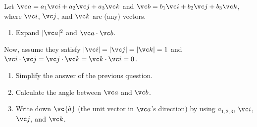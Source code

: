 \documentclass[11pt,pdfa,lastpage]{MishoNote}
\begin{document}
\begin{problems}
  \Problem[S] Let $ \vc a=a_1\vc i+a_2\vc j+a_3\vc k$ and $\vc b=b_1\vc i+b_2\vc j+b_3\vc k$,
  where $\vc i$, $\vc j$, and $\vc k$ are (any) vectors.
  \begin{enumerate}
    \item Expand $|\vc a|^2$ and $\vc a\cdot\vc b$.
  \end{enumerate}
  Now, assume they satisfy $|\vc i|=|\vc j|=|\vc k|=1$ and $\vc i\cdot\vc j=\vc j\cdot\vc k=\vc k\cdot\vc i=0$.
  \begin{enumerate}[resume]
    \item Simplify the answer of the previous question.
    \item Calculate the angle between $\vc a$ and $\vc b $.
    \item Write down $\vc{\hat a}$ (the unit vector in $\vc a$'s direction) by using $a_{1,2,3}$, $\vc i$, $\vc j$, and $\vc k$.
  \end{enumerate}
\end{problems}
\end{document}
